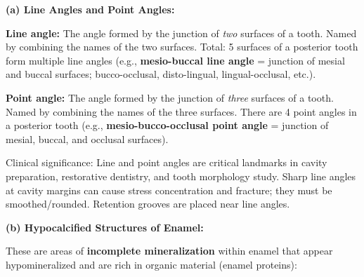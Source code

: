 \documentclass[11pt,a4paper]{article}
\begin{document}
\begin{ansbox}
\textbf{(a) Line Angles and Point Angles:}

\textbf{Line angle:} The angle formed by the junction of \textit{two} surfaces of a tooth. Named by combining the names of the two surfaces. Total: 5 surfaces of a posterior tooth form multiple line angles (e.g., \textbf{mesio-buccal line angle} = junction of mesial and buccal surfaces; bucco-occlusal, disto-lingual, lingual-occlusal, etc.).

\textbf{Point angle:} The angle formed by the junction of \textit{three} surfaces of a tooth. Named by combining the names of the three surfaces. There are 4 point angles in a posterior tooth (e.g., \textbf{mesio-bucco-occlusal point angle} = junction of mesial, buccal, and occlusal surfaces).

Clinical significance: Line and point angles are critical landmarks in cavity preparation, restorative dentistry, and tooth morphology study. Sharp line angles at cavity margins can cause stress concentration and fracture; they must be smoothed/rounded. Retention grooves are placed near line angles.

\textbf{(b) Hypocalcified Structures of Enamel:}

These are areas of \textbf{incomplete mineralization} within enamel that appear hypomineralized and are rich in organic material (enamel proteins):


\end{ansbox}
\end{document}
